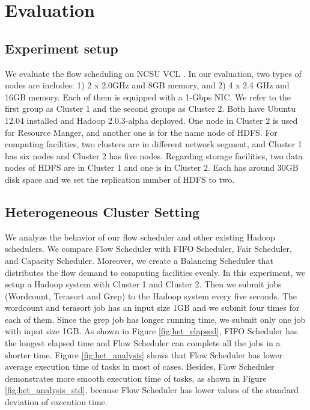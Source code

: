 \section{Evaluation}
\label{sec:evaluation}

\subsection{Experiment setup}
We evaluate the flow scheduling on NCSU VCL \cite{VCL}.
In our evaluation, two types of nodes are includes:
1) 2 x 2.0GHz and 8GB memory, and 2) 4 x 2.4 GHz and 16GB memory.
Each of them is equipped with a 1-Gbps NIC.
We refer to the first group as Cluster 1 and the second groups as Cluster 2.
Both have Ubuntu 12.04 installed and Hadoop 2.0.3-alpha deployed.
One node in Cluster 2  is used for Resource Manger, and another one is for the name node of HDFS.
For computing facilities, two clusters are in different network segment, and Cluster 1 has six nodes and Cluster 2 has five nodes.
Regarding storage facilities, two data nodes of HDFS are in Cluster 1 and one is in Cluster 2.
Each has around 30GB disk space and we set the replication number of HDFS to two.

\subsection{Heterogeneous Cluster Setting}

We analyze the behavior of our flow scheduler and other existing Hadoop schedulers.
We compare Flow Scheduler with FIFO Scheduler, Fair Scheduler, and Capacity Scheduler.
Moreover, we create a Balancing Scheduler that distributes the flow demand to computing facilities evenly.
In this experiment, we setup a Hadoop system with Cluster 1 and Cluster 2.
Then we submit jobs (Wordcount, Terasort and Grep) to the Hadoop system every five seconds.
The wordcount and terasort job has an input size 1GB and we submit four times for each of them.
Since the grep job has longer running time, we submit only one job with input size 1GB.
As shown in Figure \ref{fig:het_elapsed}, FIFO Scheduler has the longest elapsed time and Flow Scheduler can complete all the jobs in a shorter time.
Figure \ref{fig:het_analysis} shows that Flow Scheduler has lower average execution time of tasks in most of cases.
Besides, Flow Scheduler demonstrates more smooth execution time of tasks, as shown in Figure \ref{fig:het_analysis_std}, because Flow Scheduler has lower values of the standard deviation of execution time.


